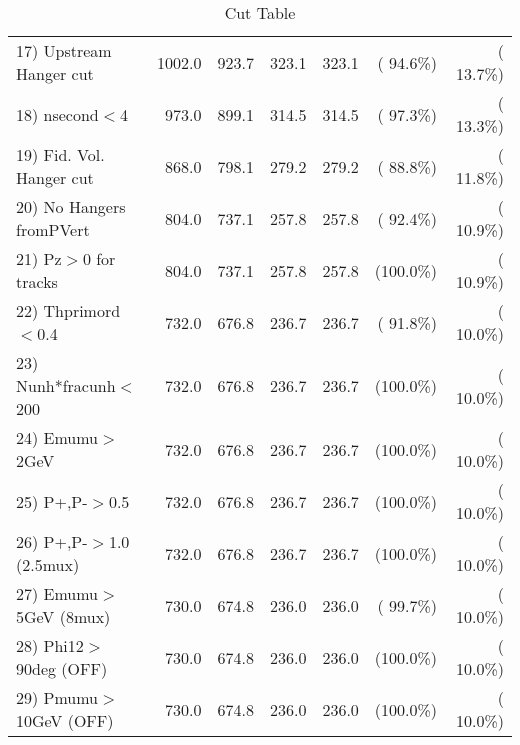 \begin{table}[h!]
\begin{tabular}{||l||r|r|r|r|r|r||}
 17) Upstream Hanger cut  &       1002.0 &        923.7 &        323.1 &        323.1 & ( 94.6\%) & ( 13.7\%) \\
 18) nsecond$<$4          &        973.0 &        899.1 &        314.5 &        314.5 & ( 97.3\%) & ( 13.3\%) \\
 19) Fid. Vol. Hanger cut &        868.0 &        798.1 &        279.2 &        279.2 & ( 88.8\%) & ( 11.8\%) \\
 20) No Hangers fromPVert &        804.0 &        737.1 &        257.8 &        257.8 & ( 92.4\%) & ( 10.9\%) \\
 21) Pz$>$0 for tracks    &        804.0 &        737.1 &        257.8 &        257.8 & (100.0\%) & ( 10.9\%) \\
 22) Thprimord$<$0.4      &        732.0 &        676.8 &        236.7 &        236.7 & ( 91.8\%) & ( 10.0\%) \\
 23) Nunh*fracunh$<$200   &        732.0 &        676.8 &        236.7 &        236.7 & (100.0\%) & ( 10.0\%) \\
 24) Emumu$>$2GeV         &        732.0 &        676.8 &        236.7 &        236.7 & (100.0\%) & ( 10.0\%) \\
 25) P+,P-$>$0.5          &        732.0 &        676.8 &        236.7 &        236.7 & (100.0\%) & ( 10.0\%) \\
 26) P+,P-$>$1.0 (2.5mux) &        732.0 &        676.8 &        236.7 &        236.7 & (100.0\%) & ( 10.0\%) \\
 27) Emumu$>$5GeV  (8mux) &        730.0 &        674.8 &        236.0 &        236.0 & ( 99.7\%) & ( 10.0\%) \\
 28) Phi12$>$90deg  (OFF) &        730.0 &        674.8 &        236.0 &        236.0 & (100.0\%) & ( 10.0\%) \\
 29) Pmumu$>$10GeV  (OFF) &        730.0 &        674.8 &        236.0 &        236.0 & (100.0\%) & ( 10.0\%) \\
 \hline
 \hline
 \end{tabular}
 \caption{Cut Table           }
 \label{tab-cutcohjpsi-mumu_ccdis}
 \end{table}
